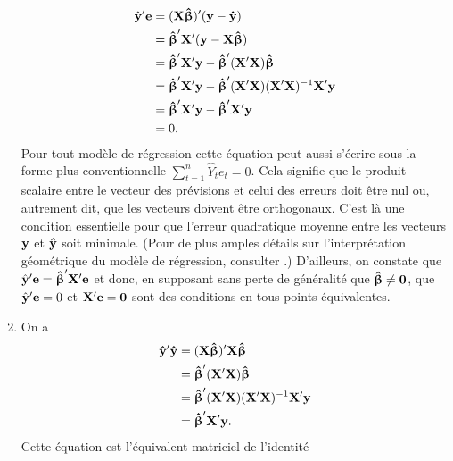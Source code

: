 \begin{solution}{3.4}
\begin{enumerate}
\begin{align*}
         \hat{\mathbf{y}}^\prime \mathbf{e}
         &= (\mathbf{X}\boldsymbol{\hat{\upbeta}})^\prime (\mathbf{y - \hat{y}}) \\
         &= \boldsymbol{\hat{\upbeta}}^\prime \mathbf{X}^\prime (\mathbf{y} - \mathbf{X}\boldsymbol{\hat{\upbeta}}) \\
         &= \boldsymbol{\hat{\upbeta}}^\prime \mathbf{X}^\prime \mathbf{y} - \boldsymbol{\hat{\upbeta}}^\prime
         (\mathbf{X}^\prime \mathbf{X}) \boldsymbol{\hat{\upbeta}} \\
         &= \boldsymbol{\hat{\upbeta}}^\prime \mathbf{X}^\prime \mathbf{y} - \boldsymbol{\hat{\upbeta}}^\prime
         (\mathbf{X}^\prime \mathbf{X}) (\mathbf{X}^\prime \mathbf{X})^{-1}
         \mathbf{X}^\prime \mathbf{y} \\
         &= \boldsymbol{\hat{\upbeta}}^\prime \mathbf{X}^\prime \mathbf{y} - \boldsymbol{\hat{\upbeta}}^\prime
         \mathbf{X}^\prime \mathbf{y} \\
         &= 0.
       \end{align*}
       Pour tout modèle de régression cette équation peut aussi
       s'écrire sous la forme plus conventionnelle $\sum_{t=1}^n
       \hat{Y}_t e_t = 0$. Cela signifie que le produit scalaire entre
       le vecteur des prévisions et celui des erreurs doit être nul
       ou, autrement dit, que les vecteurs doivent être orthogonaux.
       C'est là une condition essentielle pour que l'erreur
       quadratique moyenne entre les vecteurs $\mathbf{y}$ et
       $\mathbf{\hat{y}}$ soit minimale. (Pour de plus amples détails sur
       l'interprétation géométrique du modèle de régression, consulter
       {\shorthandoff{:} \citet[chapitres 20 et
         21]{Draper:regression:1998}}.)
         D'ailleurs, on constate que
       $\hat{\mathbf{y}}^\prime \mathbf{e} = \boldsymbol{\hat{\upbeta}}^\prime \mathbf{X}^\prime
       \mathbf{e}$ et donc, en supposant sans perte de généralité que
       $\boldsymbol{\hat{\upbeta}} \ne \mathbf{0}$,
       que $\hat{\mathbf{y}}^\prime \mathbf{e} = 0$
       et $\mathbf{X}^\prime \mathbf{e} = \mathbf{0}$ sont des conditions en
       tous points équivalentes.
     \item On a
       \begin{align*}
         \mathbf{\hat{y}}^\prime \mathbf{\hat{y}}
         &= (\mathbf{X} \boldsymbol{\hat{\upbeta}})^\prime \mathbf{X} \boldsymbol{\hat{\upbeta}} \\
         &= \boldsymbol{\hat{\upbeta}}^\prime (\mathbf{X}^\prime \mathbf{X}) \boldsymbol{\hat{\upbeta}} \\
         &= \boldsymbol{\hat{\upbeta}}^\prime (\mathbf{X}^\prime \mathbf{X}) (\mathbf{X}^\prime
         \mathbf{X})^{-1} \mathbf{X}^\prime \mathbf{y} \\
         &= \boldsymbol{\hat{\upbeta}}^\prime \mathbf{X}^\prime \mathbf{y}.
       \end{align*}
       Cette équation est l'équivalent matriciel de l'identité
       \begin{align*}

\end{align*}
\end{enumerate}
\end{solution}
